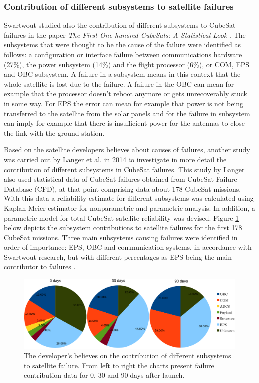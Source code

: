 \documentclass[english,12pt,a4paper,pdftex,elec,utf8]{aaltothesis}
\begin{document}
\subsubsection{Contribution of different subsystems to satellite failures}
Swartwout studied also the contribution of different subsystems to CubeSat failures in the paper \textit{The First One hundred CubeSats: A Statistical Look} \cite{Swart1}. The subsystems that were thought to be the cause of the failure were identified as follows: a configuration or interface failure between communications hardware (27\%), the power subsystem (14\%) and the flight processor (6\%), or COM, EPS and OBC subsystem. A failure in a subsystem means in this context that the whole satellite is lost due to the failure. A failure in the OBC can mean for example that the processor doesn't reboot anymore or gets unrecoverably stuck in some way. For EPS the error can mean for example that power is not being transferred to the satellite from the solar panels and for the failure in subsystem can imply for example that there is insufficient power for the antennas to close the link with the ground station.  \cite{Swart1}\par
Based on the satellite developers believes about causes of failures, another study was carried out by Langer et al. in 2014 \cite{Langer} to investigate in more detail the contribution of different subsystems in CubeSat failures. This study by Langer also used statistical data of CubeSat failures obtained from CubeSat Failure Database (CFD), at that point comprising data about 178 CubeSat missions. With this data a reliability estimate for different subsystems was calculated using Kaplan-Meier estimator for nonparametric and parametric analysis. In addition, a parametric model for total CubeSat satellite reliability was devised. Figure \ref{subsystemfailures} below depicts the subsystem contributions to satellite failures for the first 178 CubeSat missions. Three main subsystems causing failures were identified in order of importance: EPS, OBC and communication systems, in accordance with Swartwout research, but with different percentages as EPS being the main contributor to failures \cite{Langer, Swart1}. \par
\begin{figure}[h!]
\centering
\includegraphics[scale=0.5]{subsystemmerge}
\caption{The developer's believes on the contribution of different subsystems to satellite failure. From left to right the charts present failure contribution data for 0, 30 and 90 days after launch. \cite{Langer}}
\label{subsystemfailures}
\end{figure}  
\end{document}
